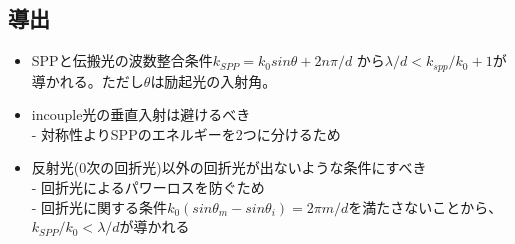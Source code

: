 \documentclass[11pt]{article}
\begin{document}
\subsection{導出}
\begin{itemize}
\item SPPと伝搬光の波数整合条件$k_{SPP}=k_0 sin \theta + 2n \pi /d$ から$\lambda /d < k_{spp}/k_0 +1$が導かれる。ただし$\theta$は励起光の入射角。
\item incouple光の垂直入射は避けるべき\\
- 対称性よりSPPのエネルギーを2つに分けるため
\item 反射光(0次の回折光)以外の回折光が出ないような条件にすべき\\
- 回折光によるパワーロスを防ぐため\\
- 回折光に関する条件$k_0(sin \theta_m - sin \theta_i ) = 2 \pi m / d$を満たさないことから、
$k_{SPP}/k_0 < \lambda / d$が導かれる
\end{itemize}



\end{document}
